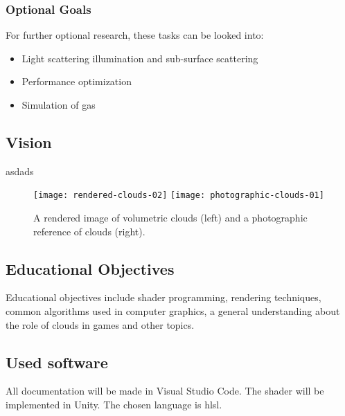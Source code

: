 \subsubsection{Optional Goals}
For further optional research, these tasks can be looked into:
\begin{itemize}
    \item Light scattering illumination and sub-surface scattering
    \item Performance optimization
    \item Simulation of gas
\end{itemize}

\clearpage

\subsection{Vision}
asdads

\begin{figure}[ht]
    \centering
    \texttt{[image: rendered-clouds-02]}
    \hspace{0.02\linewidth}
    \texttt{[image: photographic-clouds-01]}
    \caption{A rendered image of volumetric clouds\protect\cite{img:rendered:clouds02} (left) and a photographic reference of clouds\protect\cite{img:photo:clouds01} (right). }
    \label{fig:vision} 
\end{figure}

\subsection{Educational Objectives}
Educational objectives include shader programming, rendering techniques, common algorithms used in computer graphics, a general understanding about the role of clouds in games and other topics.

\subsection{Used software}
All documentation will be made in Visual Studio Code.
The shader will be implemented in Unity. The chosen language is \gls{hlsl}.
